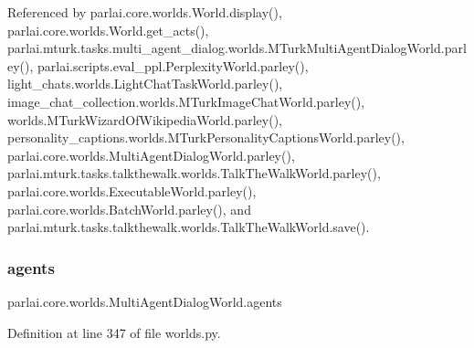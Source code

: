 Referenced by parlai.\+core.\+worlds.\+World.\+display(), parlai.\+core.\+worlds.\+World.\+get\+\_\+acts(), parlai.\+mturk.\+tasks.\+multi\+\_\+agent\+\_\+dialog.\+worlds.\+M\+Turk\+Multi\+Agent\+Dialog\+World.\+parley(), parlai.\+scripts.\+eval\+\_\+ppl.\+Perplexity\+World.\+parley(), light\+\_\+chats.\+worlds.\+Light\+Chat\+Task\+World.\+parley(), image\+\_\+chat\+\_\+collection.\+worlds.\+M\+Turk\+Image\+Chat\+World.\+parley(), worlds.\+M\+Turk\+Wizard\+Of\+Wikipedia\+World.\+parley(), personality\+\_\+captions.\+worlds.\+M\+Turk\+Personality\+Captions\+World.\+parley(), parlai.\+core.\+worlds.\+Multi\+Agent\+Dialog\+World.\+parley(), parlai.\+mturk.\+tasks.\+talkthewalk.\+worlds.\+Talk\+The\+Walk\+World.\+parley(), parlai.\+core.\+worlds.\+Executable\+World.\+parley(), parlai.\+core.\+worlds.\+Batch\+World.\+parley(), and parlai.\+mturk.\+tasks.\+talkthewalk.\+worlds.\+Talk\+The\+Walk\+World.\+save().

\mbox{\label{classparlai_1_1core_1_1worlds_1_1MultiAgentDialogWorld_a05fc93525cb86edef121980fc55f9926}} 
\subsubsection{\texorpdfstring{agents}{agents}}
{\footnotesize\ttfamily parlai.\+core.\+worlds.\+Multi\+Agent\+Dialog\+World.\+agents}



Definition at line 347 of file worlds.\+py.



